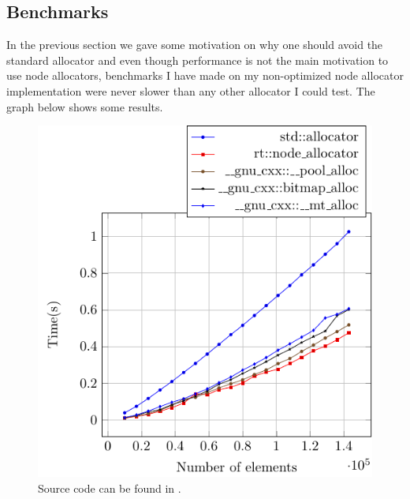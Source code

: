 \documentclass[11pt]{article}
\begin{document}
\subsection{Benchmarks}

In the previous section we gave some motivation on why one should avoid
the standard allocator and even though performance is not the main motivation
to use node allocators, benchmarks I have made on my non-optimized
node allocator implementation were never slower than any other allocator
I could test.  The graph below shows some results.

\begin{figure}[ht]
    \centering
    \includegraphics[scale=1]{fig/node_alloc_bench.pdf}
    \caption[Benchmark]
    {Source code can be found in \cite{rtcpp}.}
    \label{fig::bench}
\end{figure}

\end{document}

